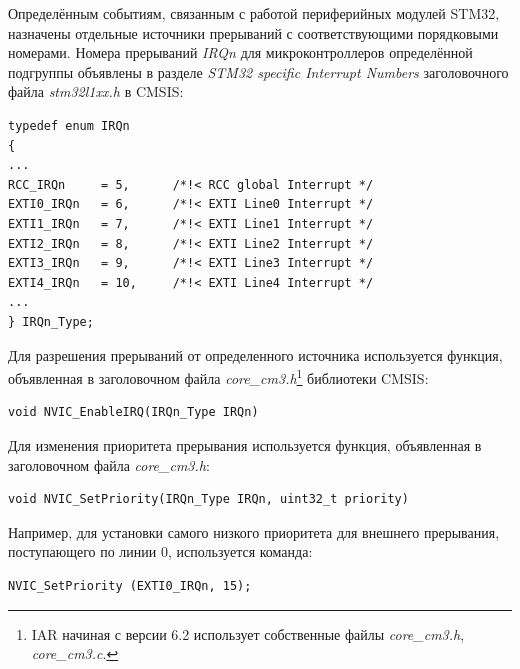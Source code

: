 Определённым событиям, связанным с работой периферийных модулей STM32, назначены отдельные источники прерываний с соответствующими порядковыми номерами. Номера прерываний \textit{IRQn} для микроконтроллеров определённой подгруппы объявлены в разделе \textit{STM32 specific Interrupt Numbers} заголовочного файла \textit{stm32l1xx.h} в CMSIS:
\begin{verbatim}
typedef enum IRQn
{
...
RCC_IRQn     = 5,      /*!< RCC global Interrupt */
EXTI0_IRQn   = 6,      /*!< EXTI Line0 Interrupt */
EXTI1_IRQn   = 7,      /*!< EXTI Line1 Interrupt */
EXTI2_IRQn   = 8,      /*!< EXTI Line2 Interrupt */
EXTI3_IRQn   = 9,      /*!< EXTI Line3 Interrupt */
EXTI4_IRQn   = 10,     /*!< EXTI Line4 Interrupt */
...
} IRQn_Type;
\end{verbatim}
Для разрешения прерываний от определенного источника используется функция, объявленная в заголовочном файла \textit{core\_cm3.h}\footnote{IAR начиная с версии 6.2 использует собственные файлы
\textit{core\_cm3.h}, \textit{core\_cm3.c}.} библиотеки CMSIS:
\begin{verbatim}
void NVIC_EnableIRQ(IRQn_Type IRQn)
\end{verbatim}
Для изменения приоритета прерывания используется функция, объявленная в заголовочном файла \textit{core\_cm3.h}:  
\begin{verbatim}
void NVIC_SetPriority(IRQn_Type IRQn, uint32_t priority)
\end{verbatim}
Например, для установки самого низкого приоритета для внешнего прерывания, поступающего по линии 0, используется команда:
\begin{verbatim}
NVIC_SetPriority (EXTI0_IRQn, 15);
\end{verbatim}

